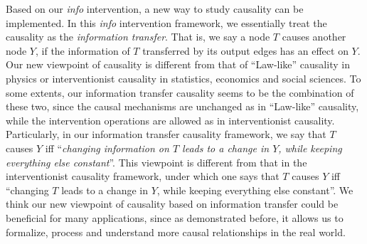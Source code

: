 Based on our \emph{info} intervention, 
a new way to study causality can be 
implemented. In this \emph{info} intervention framework, we essentially treat the causality as the \emph{information transfer}. That is, we say a node $T$ causes another node $Y$, 
if the information of $T$ transferred by its output edges has an effect on $Y$. 
Our new viewpoint of causality is different from that of 
``Law-like'' causality in  physics or 
interventionist causality in statistics, economics and social sciences. 
To some extents, our information transfer causality seems to be the combination of these two, since the causal mechanisms are unchanged as in 
``Law-like'' causality, while the intervention operations are allowed as in 
interventionist causality. Particularly, in our information transfer causality framework, we say that $T$ causes $Y$ iff 
``\emph{changing information on $T$ leads to a change in $Y$, while keeping everything else constant}''. This viewpoint is different from that in the interventionist causality framework, under which one says that $T$ causes $Y$ iff 
``changing $T$ leads to a change in $Y$, while keeping everything else constant''.
We think our new viewpoint of causality based on information transfer could be beneficial for many applications, since 
as demonstrated before, it allows us to 
formalize, process and understand more causal relationships in the real world.  










